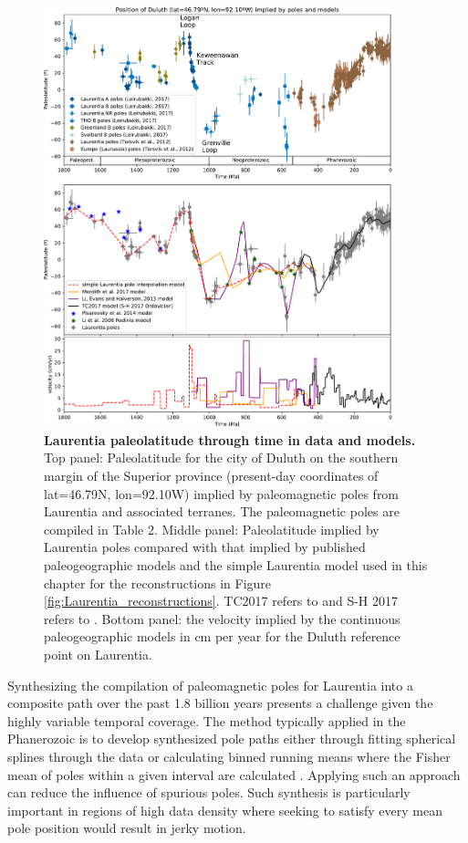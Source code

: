\documentclass[twocolumn, switch]{article} %
\begin{document}
\begin{figure}
\centering
\includegraphics[width=0.9\textwidth]{../Figures/Fig5_Laurentia_paleolatitude.pdf}
\caption{\textbf{Laurentia paleolatitude through time in data and models.} Top panel: Paleolatitude for the city of Duluth on the southern margin of the Superior province (present-day coordinates of lat=46.79\textdegree N, lon=92.10\textdegree W) implied by paleomagnetic poles from Laurentia and associated terranes. The paleomagnetic poles are compiled in Table 2. Middle panel: Paleolatitude implied by Laurentia poles compared with that implied by published paleogeographic models and the simple Laurentia model used in this chapter for the reconstructions in Figure \ref{fig:Laurentia_reconstructions}. TC2017 refers to \cite{Torsvik2017a} and S-H 2017 refers to \cite{Swanson-Hysell2017a}. Bottom panel: the velocity implied by the continuous paleogeographic models in cm per year for the Duluth reference point on Laurentia.}
\label{fig:Laurentia_paleolatitude}
\end{figure}

Synthesizing the compilation of paleomagnetic poles for Laurentia into a composite path over the past 1.8 billion years presents a challenge given the highly variable temporal coverage. The method typically applied in the Phanerozoic is to develop synthesized pole paths either through fitting spherical splines through the data or calculating binned running means where the Fisher mean of poles within a given interval are calculated \citep{Torsvik2012a}. Applying such an approach can reduce the influence of spurious poles. Such synthesis is particularly important in regions of high data density where seeking to satisfy every mean pole position would result in jerky motion.
\end{document}

